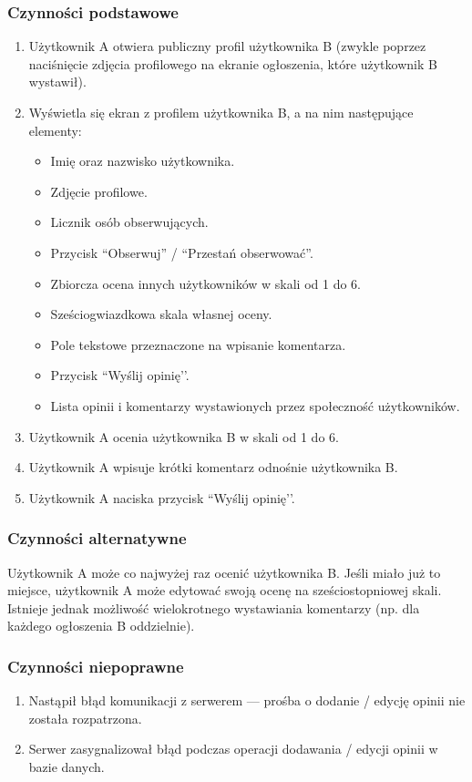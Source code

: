 \documentclass[licencjacka]{pracamgr}
\begin{document}
    \subsubsection{Czynności podstawowe}
    \begin{enumerate}
        \item Użytkownik A otwiera publiczny profil użytkownika B (zwykle poprzez naciśnięcie zdjęcia profilowego na ekranie ogłoszenia, które użytkownik B wystawił).
        \item Wyświetla się ekran z profilem użytkownika B, a na nim następujące elementy:
        \begin{itemize}
            \item Imię oraz nazwisko użytkownika.
            \item Zdjęcie profilowe.
            \item Licznik osób obserwujących.
            \item Przycisk ``Obserwuj'' / ``Przestań obserwować''.
            \item Zbiorcza ocena innych użytkowników w skali od 1 do 6.
            \item Sześciogwiazdkowa skala własnej oceny.
            \item Pole tekstowe przeznaczone na wpisanie komentarza.
            \item Przycisk ``Wyślij opinię’’.
            \item Lista opinii i komentarzy wystawionych przez społeczność użytkowników.
        \end{itemize}
        \item Użytkownik A ocenia użytkownika B w skali od 1 do 6.
        \item Użytkownik A wpisuje krótki komentarz odnośnie użytkownika B.
        \item Użytkownik A naciska przycisk ``Wyślij opinię’’.
    \end{enumerate}
    \subsubsection{Czynności alternatywne}
    Użytkownik A może co najwyżej raz ocenić użytkownika B. Jeśli miało już to miejsce, użytkownik A może edytować swoją ocenę na sześciostopniowej skali. Istnieje jednak możliwość wielokrotnego wystawiania komentarzy (np. dla każdego ogłoszenia B oddzielnie).
    \subsubsection{Czynności niepoprawne}	
    \begin{enumerate}
        \item Nastąpił błąd komunikacji z serwerem --- prośba o dodanie / edycję opinii nie została rozpatrzona.
        \item Serwer zasygnalizował błąd podczas operacji dodawania / edycji opinii w bazie danych.
    \end{enumerate}
\end{document}

